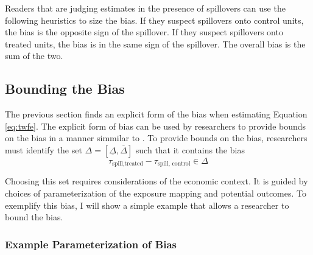 \documentclass[11pt]{article}
\begin{document}
Readers that are judging estimates in the presence of spillovers can use the following heuristics to size the bias. If they suspect spillovers onto control units, the bias is the opposite sign of the spillover. If they suspect spillovers onto treated units, the bias is in the same sign of the spillover. The overall bias is the sum of the two.



\subsection{Bounding the Bias}

The previous section finds an explicit form of the bias when estimating Equation \ref{eq:twfe}. The explicit form of bias can be used by researchers to provide bounds on the bias in a manner simmilar to \citet{Rambachan_Roth_2020}. To provide bounds on the bias, researchers must identify the set $\Delta = [\underline{\Delta}, \overline{\Delta}]$ such that it contains the bias \[ 
    \tau_{\text{spill,treated}} - \tau_{\text{spill, control}} \in \Delta
\]

Choosing this set requires considerations of the economic context. It is guided by choices of parameterization of the exposure mapping and potential outcomes. To exemplify this bias, I will show a simple example that allows a researcher to bound the bias. 


\subsubsection{Example Parameterization of Bias}
\end{document}

